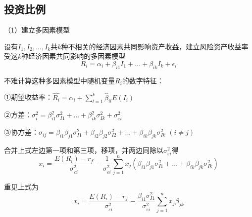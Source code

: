 
\subsection{投资比例}
（1）建立多因素模型

设有$I_1,I_2,...,I_k$共$k$种不相关的经济因素共同影响资产收益，建立风险资产收益率受这$k$种经济因素共同影响的多因素模型
\begin{equation}
R_i=\alpha_i+\beta_{i1}I_1+...+\beta_{ik}I_k+\epsilon_i
\end{equation}



不难计算这种多因素模型中随机变量$R_i$的数字特征：

①期望收益率：$\hat{R_i}=\alpha_i+\sum_{l=1}^{k}\hat\beta_{il}E(I_i)$

②方差：$\sigma_i^2=\beta_{i1}^2\sigma_{I1}^2+...+\beta_{ik}^2\sigma^2_{Ik}+\sigma^2_{\varepsilon i}$

③协方差：$\sigma_{ij}=\beta_{i1}\beta_{j1}\sigma^2_{I1}+\beta_{i2}\beta_{j2}\sigma_{I2}^2+...+\beta_{ik}\beta_{jk}\sigma_{Ik}^2$  $(i\neq j)$


合并上式左边第一项和第三项，移项，并两边同除以$\sigma^2_{\varepsilon i}$得
\begin{equation}
x_i=\frac{E(R_i)-r_f}{\sigma^2_{\varepsilon i}}-\frac{1}{\sigma^2_{\varepsilon i}}\sum_{j=1}^{n}x_j(\beta_{i1}\beta_{j1}\sigma_{I1}^2+...+\beta_{ik}\beta_{jk}\sigma^2_{Ik})
\end{equation}

重见上式为
\begin{equation}
x_i=\frac{E(R_i)-r_f}{\sigma^2_{\varepsilon i}}-\frac{\beta_{i1}\sigma^2_{I1}}{\sigma^2_{\varepsilon i}}\sum_{j=1}^{n}x_j\beta_{jk}
\end{equation}